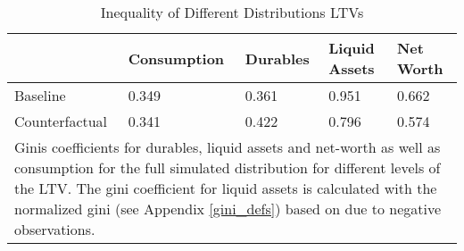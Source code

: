 \documentclass[a4paper,12pt,legno]{article}
\begin{document}
\begin{table}[!htbp]
\centering
\caption{Inequality of Different Distributions LTVs}
\label{Gini_Ranking_counter_factual}
\begin{tabular}{@{}lllll@{}}
\toprule
      & Consumption & Durables & Liquid Assets & Net Worth \\ \midrule
Baseline & 0.349       & 0.361   & 0.951        & 0.662    \\ \midrule
Counterfactual  & 0.341         & 0.422     & 0.796          & 0.574      \\ \bottomrule
\multicolumn{5}{l}{%
  \begin{minipage}{12.5cm}%
    \small Ginis coefficients for durables, liquid assets and net-worth as well as consumption for the full simulated distribution for different levels of the LTV. The gini coefficient for liquid assets is calculated with the normalized gini (see Appendix \ref{gini_defs}) based on \cite{chen1982} due to negative observations. 
  \end{minipage}%
}\\
\end{tabular}
\end{table}
\end{document}
